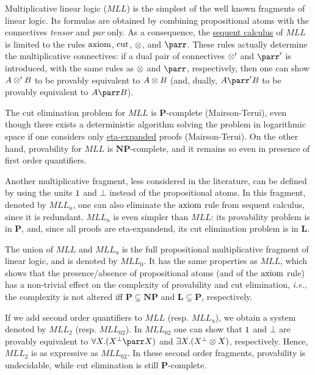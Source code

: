 Multiplicative linear logic (\(MLL\)) is the simplest of the well known
fragments of linear logic. Its formulas are obtained by combining
propositional atoms with the connectives \emph{tensor} and \emph{par}
only. As a consequence, the
\hyperref[sequents-and-proofs]{sequent calculus} of
\(MLL\) is limited to the rules \(\operatorname{axiom}\),
\(\operatorname{cut}\), \(\otimes\), and \(\parr\). These rules actually
determine the multiplicative connectives: if a dual pair of connectives
\(\otimes'\) and \(\parr'\) is introduced, with the same rules as
\(\otimes\) and \(\parr\), respectively, then one can show \(A\otimes' B\)
to be provably equivalent to \(A\otimes B\) (and, dually, \(A\parr'B\) to
be provably equivalent to \(A\parr B\)).

The cut elimination problem for \(MLL\) is \(\mathbf P\)-complete
(Mairson-Terui), even though there exists a deterministic algorithm
solving the problem in logarithmic space if one considers only
\hyperref[expansion-of-identities]{eta-expanded} proofs
(Mairson-Terui). On the other hand, provability for \(MLL\) is
\(\mathbf{NP}\)-complete, and it remains so even in presence of first
order quantifiers.

Another multiplicative fragment, less considered in the literature, can
be defined by using the units \(1\) and \(\bot\) instead of the
propositional atoms. In this fragment, denoted by \(MLL_u\), one can
also eliminate the \(\operatorname{axiom}\) rule from sequent calculus,
since it is redundant. \(MLL_u\) is even simpler than \(MLL\): its
provability problem is in \(\mathbf P\), and, since all proofs are
eta-expandend, its cut elimination problem is in \(\mathbf L\).

The union of \(MLL\) and \(MLL_u\) is the full propositional
multiplicative fragment of linear logic, and is denoted by \(MLL_0\). It
has the same properties as \(MLL\), which shows that the
presence/absence of propositional atoms (and of the \(\operatorname{axiom}\)
rule) has a non-trivial effect on the complexity of provability and cut
elimination, \emph{i.e.}, the complexity is not altered iff
\(\mathbf P\subsetneq\mathbf{NP}\) and \(\mathbf L\subsetneq\mathbf P\),
respectively.

If we add second order quantifiers to \(MLL\) (resp. \(MLL_u\)), we
obtain a system denoted by \(MLL_2\) (resp. \(MLL_{02}\)). In
\(MLL_{02}\) one can show that \(1\) and \(\bot\) are provably
equivalent to \(\forall X.(X\orth\parr X)\) and
\(\exists X.(X^\bot\otimes X)\), respectively. Hence, \(MLL_2\) is as
expressive as \(MLL_{02}\). In these second order fragments, provability
is undecidable, while cut elimination is still \(\mathbf P\)-complete.

